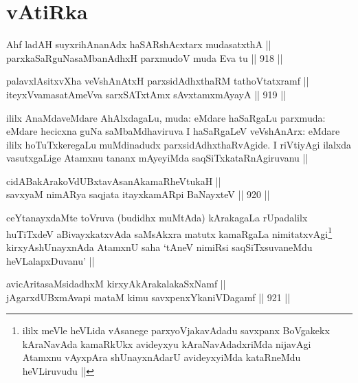 \section*{vAtiRka}

\begin{shl}
Ahf ladAH suyxrihA\s \s nanAdx haSARshAcxtarx mudasatxthA || \\
parxkaSaRguNasaMbanAdhxH parxmudoV muda Eva tu ||  918 ||  
\end{shl}
				
\begin{shl}
palavxlAsitxvXha veVshAnAtxH parxsidAdhxthaRM tathoVtatxramf || \\
iteyxVvamasatAmeVva sarxSATx\s \s tAmx sAvxtamxmAyayA ||  919 || 
\end{shl}

\begin{artha}
ililx AnaMdaveMdare AhAlxdagaLu, muda: eMdare haSaRgaLu parxmuda: eMdare hecicxna guNa saMbaMdhaviruva I haSaRgaLeV veVshAnArx: eMdare ililx hoTuTxkeregaLu muMdinadudx parxsidAdhxthaRvAgide. I riVtiyAgi ilalxda vasutxgaLige Atamxnu tananx mAyeyiMda saqSiTxkataRnAgiruvanu ||
\end{artha}


\begin{shl}
cidABakArakoVdUBxtavAsanAkamaRheVtukaH || \\
savxyaM nimARya saqjata itayxkamARpi BaNayxteV ||  920 ||  
\end{shl}

\begin{artha}
ceYtanayxdaMte toVruva (budidhx muMtAda) kArakagaLa rUpadalilx huTiTxdeV aBivayxkatxvAda saMsAkxra matutx kamaRgaLa nimitatxvAgi\footnote{ililx meVle heVLida vAsanege parxyoVjakavAdadu savxpanx BoVgakekx kAraNavAda kamaRkUkx avideyxyu kAraNavAdadxriMda nijavAgi Atamxnu vAyxpAra shUnayxnAdarU avideyxyiMda kataRneMdu heVLiruvudu ||} kirxyAshUnayxnAda AtamxnU saha `tAneV nimiRsi saqSiTxsuvaneMdu heVLalapxDuvanu' ||
\end{artha}


\begin{shl}
avicAritasaMsidadhxM kirxyAkArakalakaSxNamf ||  \\
jAgarxdUBxmAvapi mataM kimu savxpenxYkaniVDagamf ||  921 ||  
\end{shl}

